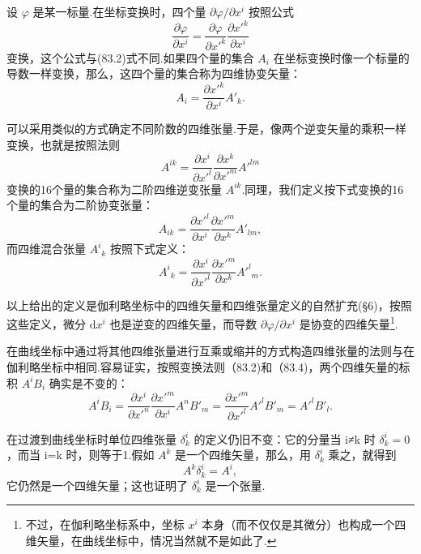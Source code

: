 设 $\varphi$ 是某一标量.在坐标变换时，四个量 $\partial\varphi/\partial x^i$ 按照公式
\begin{equation}
  \frac{\partial\varphi}{\partial x^i}
  =\frac{\partial\varphi}{\partial x'^k}
  \frac{\partial x'^k}{\partial x^i}
\end{equation}
变换，这个公式与(83.2)式不同.如果四个量的集合 $A_i$ 在坐标变换时像一个标量的导数一样变换，那么，这四个量的集合称为四维协变矢量：
\begin{equation}
  A_i=\frac{\partial x'^k}{\partial x^i}A'_k.
\end{equation}

可以采用类似的方式确定不同阶数的四维张量.于是，像两个逆变矢量的乘积一样变换，也就是按照法则
\begin{equation}
  A^{ik}=\frac{\partial x^i}{\partial x'^l}
  \frac{\partial x^k}{\partial x'^m}A'^{lm}
\end{equation}
变换的16个量的集合称为二阶四维逆变张量 $A^{ik}$.同理，我们定义按下式变换的16个量的集合为二阶协变张量：
\begin{equation}
  A_{ik}=\frac{\partial x'^l}{\partial x^i}
  \frac{\partial x'^m}{\partial x^k}A'_{lm},
\end{equation}
而四维混合张量 $A^i{}_k$ 按照下式定义：
\begin{equation}
  A^i{}_k=\frac{\partial x^i}{\partial x'^l}
  \frac{\partial x'^m}{\partial x^k}A'^l{}_m.
\end{equation}

以上给出的定义是伽利略坐标中的四维矢量和四维张量定义的自然扩充(§6)，按照这些定义，微分 $\mathrm{d}x^i$ 也是逆变的四维矢量，而导数 $\partial\varphi/\partial x^i$ 是协变的四维矢量\footnote{不过，在伽利略坐标系中，坐标 $x^i$ 本身（而不仅仅是其微分）也构成一个四维矢量，在曲线坐标中，情况当然就不是如此了.}.

在曲线坐标中通过将其他四维张量进行互乘或缩并的方式构造四维张量的法则与在伽利略坐标中相同.容易证实，按照变换法则（83.2)和（83.4)，两个四维矢量的标积 $A^iB_i$ 确实是不变的：
\begin{equation*}
  A^iB_i=\frac{\partial x^i}{\partial x'^n}
  \frac{\partial x'^m}{\partial x^i}A^nB'_m
  =\frac{\partial x'^m}{\partial x'^l}A'^lB'_m=A'^lB'_l.
\end{equation*}

在过渡到曲线坐标时单位四维张量 $\delta^i_k$ 的定义仍旧不变：它的分量当 i≠k 时 $\delta^i_k=0$，而当 i=k 时，则等于1.假如 $A^k$ 是一个四维矢量，那么，用 $\delta^i_k$ 乘之，就得到
\begin{equation*}
  A^k\delta^i_k=A^i,
\end{equation*}
它仍然是一个四维矢量；这也证明了 $\delta^i_k$ 是一个张量.

